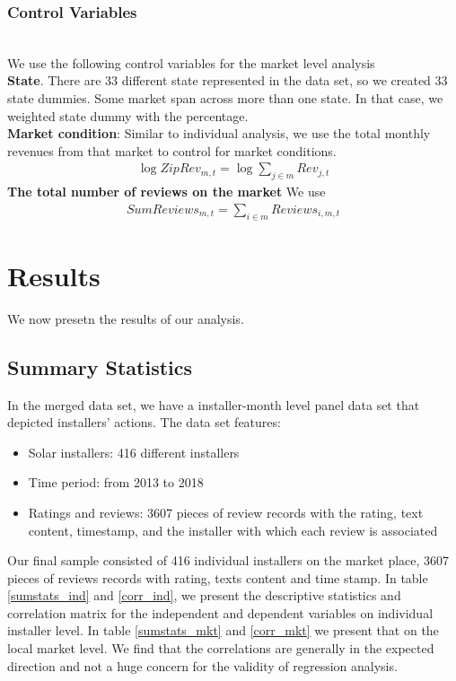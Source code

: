 \documentclass[msom,blindrev]{informs3}
\begin{document}
\subsubsection{Control Variables}\hfill\\
We use the following control variables for the market level analysis\\
\textbf{State}. There are 33 different state represented in the data set, so we created 33 state dummies. Some market span across more than one state. In that case, we weighted state dummy with the percentage. \\
\textbf{Market condition}: 
Similar to individual analysis, we use the total monthly revenues from that market to control for market conditions. 
\begin{align*}
\log ZipRev_{m,t}=\log \sum_{j\in m}Rev_{j,t}
\end{align*}
 \textbf{The total number of reviews on the market } We use 
\begin{align*}
SumReviews_{m,t}=\sum_{i\in m} Reviews_{i,m,t}
\end{align*}


\section{Results}
We now presetn the results of our analysis.
\subsection{Summary Statistics}
In the merged data set, we have a installer-month level panel data set that depicted installers' actions. The data set features: 
\begin{itemize}
\item Solar installers: 416 different installers
\item Time period: from 2013 to 2018
\item Ratings and reviews: 3607 pieces of review records with the rating, text content, timestamp, and the installer with which each review is associated  
\end{itemize}
Our final sample consisted of 416 individual installers on the market place, 3607 pieces of reviews records with rating, texts content and time stamp. In table \ref{sumstats_ind} and \ref{corr_ind}, we present the descriptive statistics and correlation matrix for the independent and dependent variables on individual installer level.  In table \ref{sumstats_mkt} and \ref{corr_mkt} we present that on the local market level. We find that the correlations are generally in the expected direction and not a huge concern for the validity of regression analysis. 




\end{document}
